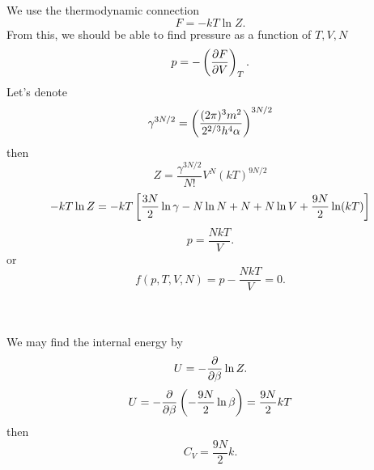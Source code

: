 \documentclass[10pt,letterpaper]{article}
\begin{document}
	\item
	We use the thermodynamic connection
	\[
		F = -kT\ln Z.
	\]	
	From this, we should be able to find pressure as a function of $T,V,N$
	\[
		p = -\plr{\pdiff[F]{V}}_T.
	\]
	Let's denote 
	\[
		\gamma^{3N/2} =\pfrac{(2\pi)^3m^2}{2^{2/3}h^4\alpha}^{3N/2}
	\]
	then
	\[
		Z = \frac{\gamma^{3N/2}}{N!}V^N(kT)^{9N/2}
	\]
	\[
		-kT\ln Z= -kT\blr{\frac{3N}{2}\ln\gamma - N\ln N +N+N\ln V +\frac{9N}{2}\ln(kT)}
	\]
	\[
		p = \frac{NkT}{V}.
	\]
	or
	\[
		f(p,T,V,N) = p-\frac{NkT}{V} = 0.
	\]
	\\ \\
	
	\item
	We may find the internal energy by 
	\[
		U = -\pdiff{\beta}\ln Z.
	\]
	\[
		U = -\pdiff{\beta}\plr{-\frac{9N}{2}\ln{\beta}} = \frac{9N}{2}kT
	\]
	then
	\[
		C_V = \frac{9N}{2}k.
	\]
	\\ \\
	\eenum 
\end{document}
